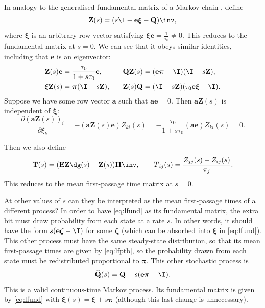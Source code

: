 \documentclass[12pt]{article}
\newcommand{\onev}{\mathbf{e}}
\newcommand{\onem}{\mathbf{E}}
\newcommand{\MMm}{Q}
\newcommand{\MM}{\mathbf{\MMm}}
\newcommand{\eqm}{\pi}
\newcommand{\eq}{\boldsymbol{\eqm}}
\newcommand{\Eqm}{\Pi}
\newcommand{\Eq}{\boldsymbol{\Eqm}}
\newcommand{\fptm}{T}
\newcommand{\fpt}{\mathbf{\fptm}}
\newcommand{\fptbm}{\overline{\fptm}}
\newcommand{\fptb}{\overline{\fpt}}
\newcommand{\fundm}{Z}
\newcommand{\fund}{\mathbf{\fundm}}
\newcommand{\arowm}{\xi}
\newcommand{\arow}{\boldsymbol{\arowm}}
\renewcommand{\pdiff}[2]{\frac{\partial #1}{\partial #2}}
\newcommand{\shift}[1]{\widehat{#1}}
\begin{document}
In analogy to the generalised fundamental matrix of a Markov chain \cite{Kemeny1981fund}, define
%
\begin{equation}\label{eq:lfund}
  \fund(s) = (s \I + \onev \arow -\MM)\inv,
\end{equation}
%
where \(\arow\) is an arbitrary row vector satisfying \(\arow \onev = \frac{1}{\tau_0} \neq 0\).
This reduces to the fundamental matrix at \(s=0\).
We can see that it obeys similar identities, including that \(\onev\) is an eigenvector:
%
\begin{equation}\label{eq:lfundrowsum}
\begin{aligned}
  \fund(s) \onev &= \frac{\tau_0}{1+s\tau_0}\onev, \qquad &
  \MM \fund(s) &= (\onev \eq - \I)(\I - s \fund), \\ 
  \arow \fund(s) &= \eq (\I - s \fund),  &
  \fund(s) \MM &= (\I - s \fund)(\tau_0 \onev \arow - \I).
\end{aligned}
\end{equation}
%
Suppose we have some row vector \(\mathbf{a}\) such that \(\mathbf{a}\onev=0\).
Then \(\mathbf{a}\fund(s)\) is independent of \(\arow\):
%
\begin{equation}\label{eq:alfund}
  \pdiff{(\mathbf{a}\fund(s))_i}{\arowm_k} = -(\mathbf{a}\fund(s)\onev) \fundm_{ki}(s)
      = -\frac{\tau_0}{1+s\tau_0} (\mathbf{a}\onev) \fundm_{ki}(s) = 0.
\end{equation}
%

Then we also define
%
\begin{equation}\label{eq:lfptb}
  \fptb(s) = (\onem \fund\dg(s)-\fund(s))\Eq\inv,
  \qquad
  \fptbm_{ij}(s) = \frac{\fundm_{jj}(s)-\fundm_{ij}(s)}{\eqm_j}.
\end{equation}
%
This reduces to the mean first-passage time matrix at \(s=0\). 

At other values of \(s\) can they be interpreted as the mean first-passage times of a different process?
In order to have \cref{eq:lfund} as its fundamental matrix, the extra bit must draw probability from each state at a rate \(s\).
In other words, it should have the form \(s(\onev \boldsymbol{\zeta} - \I)\) for some \(\boldsymbol{\zeta} \) 
(which can be absorbed into \(\arow\) in \cref{eq:lfund}).
This other process must have the same steady-state distribution, so that its mean first-passage times are given by \cref{eq:lfptb}, so the probability drawn from each state must be redistributed proportional to \(\eq\).
This other stochastic process is
%
\begin{equation}\label{eq:lshift}
  \shift{\MM}(s) = \MM + s (\onev \eq - \I).
\end{equation}
%
This is a valid continuous-time Markov process.
Its fundamental matrix is given by \cref{eq:lfund} with \( \arow(s) = \arow + s \eq \) (although this last change is unnecessary).
\end{document}
